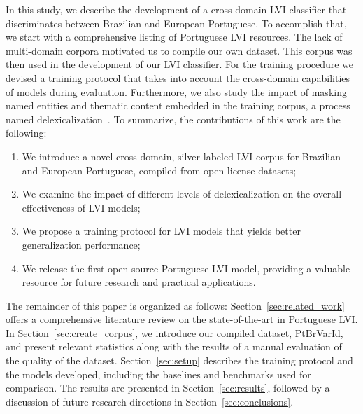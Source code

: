In this study, we describe the development of a cross-domain LVI classifier that discriminates between Brazilian and European Portuguese. To accomplish that, we start with a comprehensive listing of Portuguese LVI resources. The lack of multi-domain corpora motivated us to compile our own dataset. This corpus was then used in the development of our LVI classifier. For the training procedure we devised a training protocol that takes into account the cross-domain capabilities of models during evaluation. Furthermore, we also study the impact of masking named entities and thematic content embedded in the training corpus, a process named delexicalization~\cite{lui2014exploring}. To summarize, the contributions of this work are the following:

\begin{enumerate}

\item We introduce a novel cross-domain, silver-labeled LVI corpus for Brazilian and European Portuguese, compiled from open-license datasets;

\item We examine the impact of different levels of delexicalization on the overall effectiveness of LVI models;

\item We propose a training protocol for LVI models that yields better generalization performance;

\item We release the first open-source Portuguese LVI model, providing a valuable resource for future research and practical applications.
\end{enumerate}

The remainder of this paper is organized as follows: Section~\ref{sec:related_work} offers a comprehensive literature review on the state-of-the-art in Portuguese LVI. In Section~\ref{sec:create_corpus}, we introduce our compiled dataset, PtBrVarId, and present relevant statistics along with the results of a manual evaluation of the quality of the dataset. Section~\ref{sec:setup} describes the training protocol and the models developed, including the baselines and benchmarks used for comparison. The results are presented in Section~\ref{sec:results}, followed by a discussion of future research directions in Section~\ref{sec:conclusions}. 


